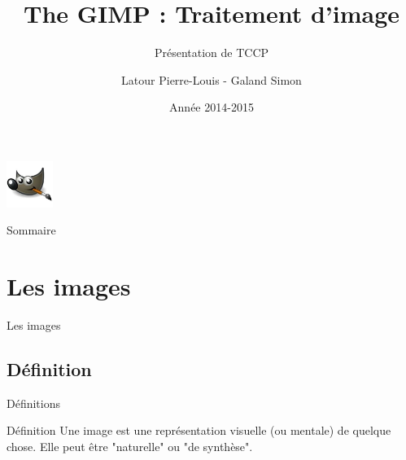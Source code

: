 \documentclass[french]{beamer}
\title{The GIMP : Traitement d'image}
\subtitle{Présentation de TCCP}
\author[Latour - Galand]{Latour Pierre-Louis - Galand Simon}
\date{Année 2014-2015}
\institute[UM2-FDS]{Université Montpellier 2 - Faculté des sciences}
\begin{document}
    \begin{frame}
	    \titlepage
	    \begin{center}
	    \includegraphics[height=1.5cm]{logo.jpeg}
	    \end{center}
    \end{frame}

    \begin{frame}{Sommaire}
	    \small\tableofcontents
    \end{frame}
    
    
    \section{Les images}
        \begin{frame}{Les images}
        \end{frame}
        
        \subsection{Définition}
            \begin{frame}{Définitions}
                \tableofcontents[sectionstyle=show/hide,subsectionstyle=show/shaded/hide]                             \end{frame}
                
            \begin{frame}
                \begin{center}
                    \begin{block}{Définition}
                        Une image est une représentation visuelle (ou mentale) de quelque chose. Elle peut  être "naturelle" ou "de synthèse". 
                    \end{block}
                \end{center}
            \end{frame}
            
\end{document}
